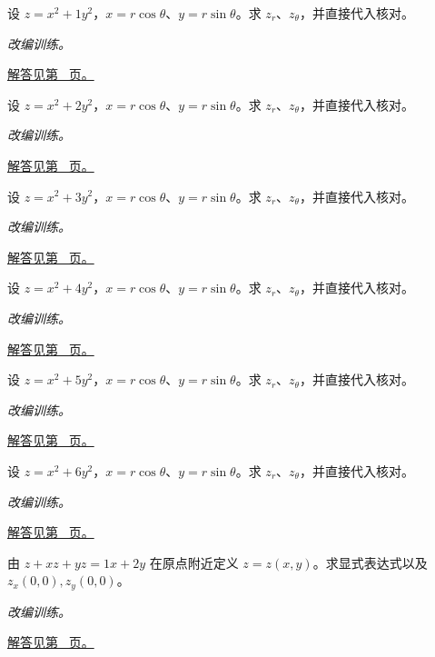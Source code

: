 \documentclass[UTF8,12pt,a4paper,fontset=fandol]{ctexart}
\begin{document}
\begin{example}[极坐标下的链式法则]\label{ex:c33q7}
设 $z=x^2+1y^2$，$x=r\cos\theta$、$y=r\sin\theta$。求 $z_r$、$z_\theta$，并直接代入核对。
\par\textit{改编训练。}\par\hyperref[ans:c33q7]{解答见第~\pageref{ans:c33q7} 页。}
\end{example}
\begin{example}[极坐标下的链式法则]\label{ex:c33q8}
设 $z=x^2+2y^2$，$x=r\cos\theta$、$y=r\sin\theta$。求 $z_r$、$z_\theta$，并直接代入核对。
\par\textit{改编训练。}\par\hyperref[ans:c33q8]{解答见第~\pageref{ans:c33q8} 页。}
\end{example}
\begin{example}[极坐标下的链式法则]\label{ex:c33q9}
设 $z=x^2+3y^2$，$x=r\cos\theta$、$y=r\sin\theta$。求 $z_r$、$z_\theta$，并直接代入核对。
\par\textit{改编训练。}\par\hyperref[ans:c33q9]{解答见第~\pageref{ans:c33q9} 页。}
\end{example}
\begin{example}[极坐标下的链式法则]\label{ex:c33q10}
设 $z=x^2+4y^2$，$x=r\cos\theta$、$y=r\sin\theta$。求 $z_r$、$z_\theta$，并直接代入核对。
\par\textit{改编训练。}\par\hyperref[ans:c33q10]{解答见第~\pageref{ans:c33q10} 页。}
\end{example}
\begin{example}[极坐标下的链式法则]\label{ex:c33q11}
设 $z=x^2+5y^2$，$x=r\cos\theta$、$y=r\sin\theta$。求 $z_r$、$z_\theta$，并直接代入核对。
\par\textit{改编训练。}\par\hyperref[ans:c33q11]{解答见第~\pageref{ans:c33q11} 页。}
\end{example}
\begin{example}[极坐标下的链式法则]\label{ex:c33q12}
设 $z=x^2+6y^2$，$x=r\cos\theta$、$y=r\sin\theta$。求 $z_r$、$z_\theta$，并直接代入核对。
\par\textit{改编训练。}\par\hyperref[ans:c33q12]{解答见第~\pageref{ans:c33q12} 页。}
\end{example}
\begin{example}[隐函数的一阶偏导]\label{ex:c33q13}
由 $z+xz+yz=1x+2y$ 在原点附近定义 $z=z(x,y)$。求显式表达式以及 $z_x(0,0),z_y(0,0)$。
\par\textit{改编训练。}\par\hyperref[ans:c33q13]{解答见第~\pageref{ans:c33q13} 页。}
\end{example}
\end{document}
